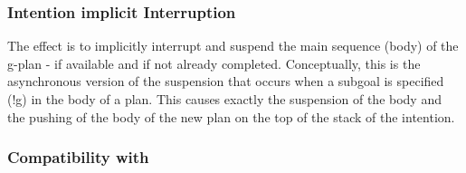 \subsubsection{Intention implicit Interruption}

The effect is to implicitly interrupt and suspend the main sequence (body) of the g-plan - if available and if not already completed.
%
Conceptually, this is the asynchronous version of the suspension that occurs when a subgoal is specified (!g) in the body of a plan. This causes exactly the suspension of the body and the pushing of the body of the new plan on the top of the stack of the intention.

\subsubsection{Compatibility with {\asl}}

